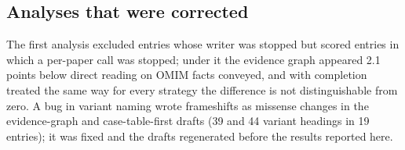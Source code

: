 \documentclass{article} %
\begin{document}
\subsection{Analyses that were corrected}
The first analysis excluded entries whose writer was stopped but scored entries in which a per-paper call was stopped; under it the evidence graph appeared 2.1 points below direct reading on OMIM facts conveyed, and with completion treated the same way for every strategy the difference is not distinguishable from zero. A bug in variant naming wrote frameshifts as missense changes in the evidence-graph and case-table-first drafts (39 and 44 variant headings in 19 entries); it was fixed and the drafts regenerated before the results reported here.
\FloatBarrier
\end{document}
